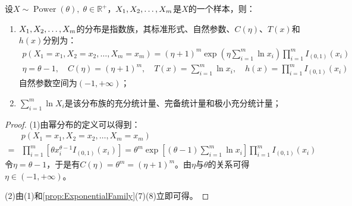 \begin{theorem}
	设$X\sim\operatorname{Power}(\theta),\;\theta\in\mathbb{R}^{+}$，$X_1, X_2, \dots, X_{m}$是$X$的一个样本，则：
	\begin{enumerate}
		\item $X_1, X_2, \dots, X_{m}$的分布是指数族，其标准形式、自然参数、$C(\eta)$、$T(x)$和$h(x)$分别为：
		\begin{gather*}
			p(X_1=x_1,X_2=x_2,\dots,X_m=x_m)=(\eta+1)^m\exp\left(\eta\sum_{i=1}^{m}\ln x_i\right)\prod_{i=1}^{m}I_{(0,1)}(x_i) \\
			\eta=\theta-1,\quad C(\eta)=(\eta+1)^m,\quad
			T(x)=\sum_{i=1}^{m}\ln x_i,\quad h(x)=\prod_{i=1}^{m}I_{(0,1)}(x_i)
		\end{gather*}
		自然参数空间为$(-1,+\infty)$；
		\item $\sum\limits_{i=1}^{m}\ln X_i$是该分布族的充分统计量、完备统计量和极小充分统计量；
	\end{enumerate}
\end{theorem}
\begin{proof}
	(1)由幂分布的定义可以得到：
	\begin{align*}
		&p(X_1=x_1,X_2=x_2,\dots,X_m=x_m) \\
		=&\prod_{i=1}^{m}\left[\theta x_i^{\theta-1}I_{(0,1)}(x_i)\right]=\theta^m\exp\left[(\theta-1)\sum_{i=1}^{m}\ln x_i\right]\prod_{i=1}^{m}I_{(0,1)}(x_i)
	\end{align*}
	令$\eta=\theta-1$，于是有$C(\eta)=\theta^{m}=(\eta+1)^m$。由$\eta$与$\theta$的关系可得$\eta\in(-1,+\infty)$。\par
	(2)由(1)和\cref{prop:ExponentialFamily}(7)(8)立即可得。
\end{proof}

